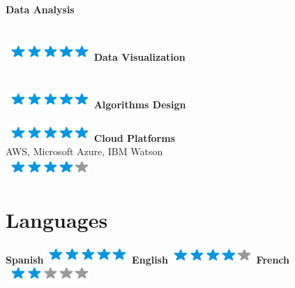 \documentclass[]{friggeri-cv}
\begin{document}
\begin{aside}
    \textbf{Data Analysis}\\\vspace{-.08in}{\tiny 4+ years of experience}\\\vspace{-.05in}{\scriptsize Pandas, Numpy \& SciPy}\\\includegraphics[scale=0.40]{img/5stars.png}
    \textbf{Data Visualization}\\\vspace{-.08in}{\tiny +4 years of experience}\\\vspace{-.05in}{\scriptsize Tableau, Seaborn, MatPlotLib }\\\includegraphics[scale=0.40]{img/5stars.png}
    \textbf{Algorithms Design}\\\vspace{-.08in}{\tiny 9+ years of experience}\\\includegraphics[scale=0.40]{img/5stars.png} 
    \textbf{Cloud Platforms}\\{\scriptsize AWS, Microsoft Azure, IBM Watson}\\\includegraphics[scale=0.40]{img/4stars.png}%
    ~
  \section{Languages}
    \textbf{Spanish}\includegraphics[scale=0.40]{img/5stars.png}
    \textbf{English}\includegraphics[scale=0.40]{img/4stars.png}
    \textbf{French}\includegraphics[scale=0.40]{img/2stars.png}
    ~
\end{aside}
\hspace{3cm}
\end{document}
